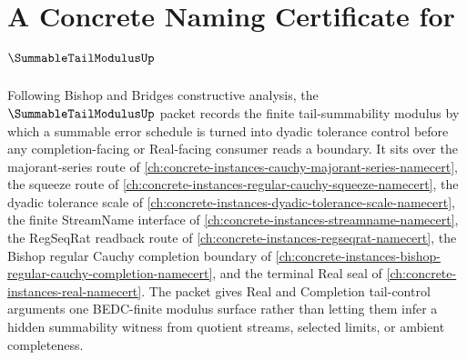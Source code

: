 \chapter{A Concrete Naming Certificate for $\SummableTailModulusUp$}
\label{ch:concrete-instances-summable-tail-modulus-namecert}

Following Bishop and Bridges constructive analysis, the $\SummableTailModulusUp$ packet records the finite tail-summability modulus by which a summable error schedule is turned into dyadic tolerance control before any completion-facing or Real-facing consumer reads a boundary. It sits over the majorant-series route of \autoref{ch:concrete-instances-cauchy-majorant-series-namecert}, the squeeze route of \autoref{ch:concrete-instances-regular-cauchy-squeeze-namecert}, the dyadic tolerance scale of \autoref{ch:concrete-instances-dyadic-tolerance-scale-namecert}, the finite StreamName interface of \autoref{ch:concrete-instances-streamname-namecert}, the RegSeqRat readback route of \autoref{ch:concrete-instances-regseqrat-namecert}, the Bishop regular Cauchy completion boundary of \autoref{ch:concrete-instances-bishop-regular-cauchy-completion-namecert}, and the terminal Real seal of \autoref{ch:concrete-instances-real-namecert}. The packet gives Real and Completion tail-control arguments one BEDC-finite modulus surface rather than letting them infer a hidden summability witness from quotient streams, selected limits, or ambient completeness.

